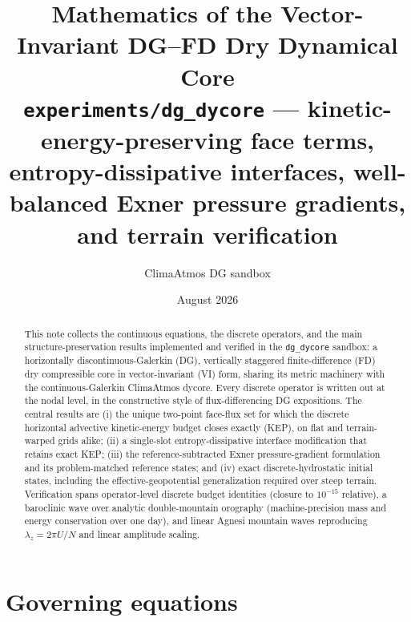 \documentclass[11pt]{article}
\title{Mathematics of the Vector-Invariant DG--FD Dry Dynamical Core\\
{\large \texttt{experiments/dg\_dycore} --- kinetic-energy-preserving face
terms, entropy-dissipative interfaces, well-balanced Exner pressure
gradients, and terrain verification}}
\author{ClimaAtmos DG sandbox}
\date{August 2026}
\begin{document}
\maketitle

\begin{abstract}
This note collects the continuous equations, the discrete operators, and
the main structure-preservation results implemented and verified in the
\texttt{dg\_dycore} sandbox: a horizontally discontinuous-Galerkin (DG),
vertically staggered finite-difference (FD) dry compressible core in
vector-invariant (VI) form, sharing its metric machinery with the
continuous-Galerkin ClimaAtmos dycore. Every discrete operator is written
out at the nodal level, in the constructive style of flux-differencing DG
expositions. The central results are (i) the unique two-point face-flux
set for which the discrete horizontal advective kinetic-energy budget
closes exactly (KEP), on flat and terrain-warped grids alike; (ii) a
single-slot entropy-dissipative interface modification that retains exact
KEP; (iii) the reference-subtracted Exner pressure-gradient formulation
and its problem-matched reference states; and (iv) exact
discrete-hydrostatic initial states, including the effective-geopotential
generalization required over steep terrain. Verification spans
operator-level discrete budget identities (closure to $10^{-15}$
relative), a baroclinic wave over analytic double-mountain orography
(machine-precision mass and energy conservation over one day), and linear
Agnesi mountain waves reproducing $\lambda_z = 2\pi U/N$ and linear
amplitude scaling.
\end{abstract}

\section{Governing equations}
\label{sec:continuous}
\end{document}

